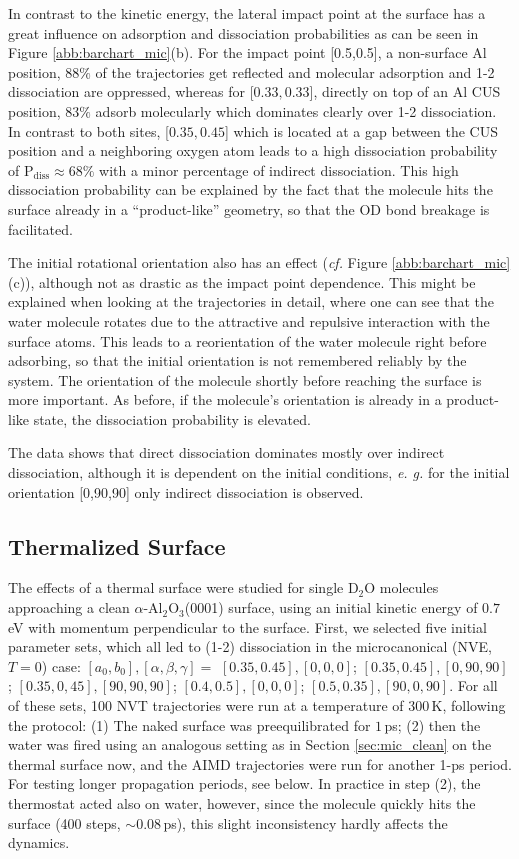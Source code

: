 \documentclass[11pt,DIV=13,BCOR=5mm,a4paper,headinclude]{scrbook}
\begin{document}
In contrast to the kinetic energy, the lateral impact point at the surface has a great influence on adsorption and dissociation probabilities as can be seen in Figure \ref{abb:barchart_mic}(b).
For the impact point [0.5,0.5], a non-surface Al position, $88\%$ of the trajectories get reflected and molecular adsorption and 1-2 dissociation are oppressed, whereas for [$0.33,0.33$], directly on top of an Al CUS position, $83\%$ adsorb molecularly which dominates clearly over 1-2 dissociation.
In contrast to both sites, [$0.35,0.45$] which is located at a gap between the CUS position and a neighboring oxygen atom leads to a high dissociation probability of P$_\textrm{diss}\approx 68\%$ with a minor percentage of indirect dissociation.
This high dissociation probability can be explained by the fact that the molecule hits the surface already in a ``product-like'' geometry, so that the OD bond breakage is facilitated.


The initial rotational orientation also has an effect (\textit{cf.} Figure \ref{abb:barchart_mic}(c)), although not as drastic as the impact point dependence.
This might be explained when looking at the trajectories in detail, where one can see that the water molecule rotates due to the attractive and repulsive interaction with the surface atoms.
This leads to a reorientation of the water molecule right before adsorbing, so that the initial orientation is not remembered reliably by the system.
The orientation of the molecule shortly before reaching the surface is more important.
As before, if the molecule's orientation is already in a product-like state, the dissociation probability is elevated.


The data shows that direct dissociation dominates mostly over indirect dissociation, although it is dependent on the initial conditions, \textit{e.
g.} for the initial orientation [0,90,90] only indirect dissociation is observed.

 \clearpage
\subsection{Thermalized Surface}\label{therm_surf}
The effects of a thermal surface were studied for single D$_2$O molecules approaching a clean $\alpha$-Al$_2$O$_3$(0001) surface, using an initial kinetic energy of $0.7\,$eV with momentum perpendicular to the surface.
First, we selected five initial parameter sets, which all led to (1-2) dissociation in the microcanonical (NVE, $T=0$) case: $[a_0,b_0],[\alpha,\beta,\gamma]=$ $[0.35,0.45],[0,0,0]$; $[0.35,0.45],[0,90,90]$; $[0.35,0,45],[90,90,90]$; $[0.4,0.5],[0,0,0]$;  $[0.5,0.35],[90,0,90]$.
For all of these sets, 100 NVT trajectories were run at a temperature of $300\,$K, following the protocol: (1) The naked surface was preequilibrated for $1\,$ps; (2) then the water was fired using an analogous setting as in Section \ref{sec:mic_clean} on the thermal surface now, and the AIMD trajectories were run for another 1-ps period. For testing longer propagation periods, see below.
In practice in step (2), the thermostat acted also on water, however, since the molecule quickly hits the surface (400 steps, $\sim 0.08\,$ps), this slight inconsistency hardly affects the dynamics.
\\
\end{document}
